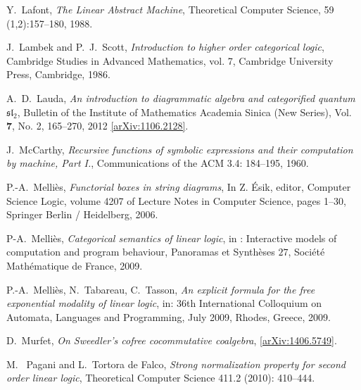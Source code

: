 \documentclass[english,letter paper,12pt,reqno]{article}
\theoremstyle{example}
\begin{document}
\begin{thebibliography}{BHLS03}
Y.~Lafont, \textsl{The {L}inear {A}bstract {M}achine}, Theoretical Computer Science, 59 (1,2):157--180, 1988.

J.~Lambek and P.~J.~Scott, \textsl{Introduction to higher order categorical logic}, Cambridge Studies in Advanced Mathematics, vol. 7, Cambridge University Press, Cambridge, 1986.

A.~D.~Lauda, \textsl{An introduction to diagrammatic algebra and categorified quantum $\mathfrak{sl}_2$}, Bulletin of the Institute of Mathematics Academia Sinica (New Series), Vol. \textbf{7}, No. 2, 165--270, 2012 \href{http://arxiv.org/abs/1106.2128}{[arXiv:1106.2128]}.

J.~McCarthy, \textsl{Recursive functions of symbolic expressions and their computation by machine, Part I.}, Communications of the ACM 3.4: 184--195, 1960.

  
P.-A.~Melli\`{e}s, \textsl{Functorial boxes in string diagrams}, In Z. \'{E}sik, editor, Computer Science Logic,
volume 4207 of Lecture Notes in Computer Science, pages 1--30, Springer Berlin / Heidelberg,
2006.

P-A.~Melli\`{e}s, \textsl{Categorical semantics of linear logic}, in : Interactive models of computation and program behaviour, Panoramas et Synth\`{e}ses $27$, Soci\'{e}t\'{e} Math\'{e}matique de France, 2009.

P.-A.~Melli\`{e}s, N.~Tabareau, C.~Tasson, \textsl{An explicit formula for the free exponential modality of linear logic}, in: 36th International Colloquium on Automata, Languages and Programming, July 2009, Rhodes, Greece, 2009.


D.~Murfet, \textsl{On Sweedler's cofree cocommutative coalgebra}, \href{http://arxiv.org/abs/1406.5749}{[arXiv:1406.5749]}.

M.~ Pagani and L.~Tortora de Falco, \textsl{Strong normalization property for second order linear logic}, Theoretical Computer Science 411.2 (2010): 410--444.



\end{thebibliography}
\end{document}
